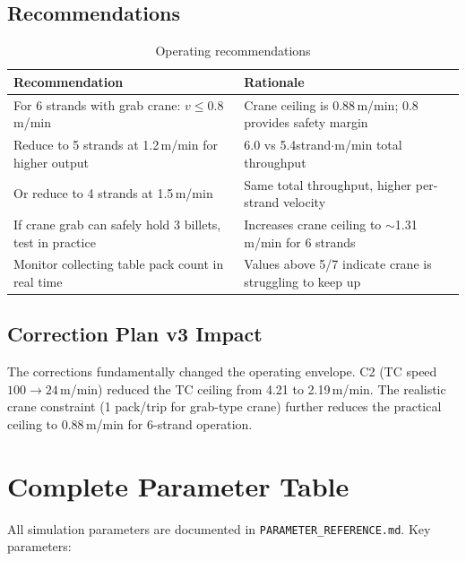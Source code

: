 \documentclass[11pt,a4paper]{article}
\begin{document}
\subsection{Recommendations}

\begin{table}[H]
\centering
\caption{Operating recommendations}
\label{tab:recommendations}
\begin{tabular}{@{}p{6cm}p{8cm}@{}}
\toprule
Recommendation & Rationale \\
\midrule
For 6 strands with grab crane: $v \leq 0.8$\,m/min & Crane ceiling is 0.88\,m/min; 0.8 provides safety margin \\
Reduce to 5 strands at 1.2\,m/min for higher output & 6.0 vs 5.4\;strand$\cdot$m/min total throughput \\
Or reduce to 4 strands at 1.5\,m/min & Same total throughput, higher per-strand velocity \\
If crane grab can safely hold 3 billets, test in practice & Increases crane ceiling to $\sim$1.31\,m/min for 6 strands \\
Monitor collecting table pack count in real time & Values above 5/7 indicate crane is struggling to keep up \\
\bottomrule
\end{tabular}
\end{table}

\subsection{Correction Plan v3 Impact}

The corrections fundamentally changed the operating envelope. C2 (TC speed $100 \to 24$\,m/min) reduced the TC ceiling from 4.21 to 2.19\,m/min. The realistic crane constraint (1 pack/trip for grab-type crane) further reduces the practical ceiling to 0.88\,m/min for 6-strand operation.

\appendix

\section{Complete Parameter Table}
\label{app:parameters}

All simulation parameters are documented in \texttt{PARAMETER\_REFERENCE.md}. Key parameters:
\end{document}
